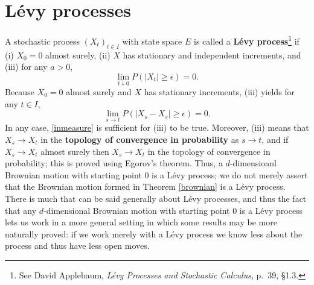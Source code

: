 \documentclass{article}
\theoremstyle{definition}
\begin{document}
\section{L\'evy processes}
A stochastic process $(X_t)_{t \in I}$ with state space $E$ is called a \textbf{L\'evy process}\footnote{See
David Applebaum, {\em L\'evy Processes and Stochastic Calculus}, p.~39, \S 1.3.}
 if
(i) $X_0=0$ almost surely, (ii) $X$ has stationary and independent increments, and (iii)
for any $a>0$,
\[
\lim_{t \downarrow 0} P(|X_{t}| \geq \epsilon) = 0.
\]
Because $X_0=0$ almost surely and $X$ has stationary increments, (iii) yields for
any $t \in I$,
\begin{equation}
\lim_{s \to t} P(|X_s-X_s| \geq \epsilon)=0.
\label{inmeasure}
\end{equation}
In any case, \eqref{inmeasure} is sufficient for (iii) to be true.
Moreover, (iii) means
that $X_s \to X_t$ in the \textbf{topology of convergence in probability} as $s \to t$, and 
if $X_s \to X_t$ almost surely then  $X_s \to X_t$ in the topology of convergence in probability; this is proved
using Egorov's theorem.
Thus, a $d$-dimensioanl Brownian motion with starting point $0$ is a L\'evy process; we do not merely assert that the Brownian motion
formed in Theorem \ref{brownian} is a L\'evy process.
There is much that can be said generally about L\'evy processes, and thus the fact that any $d$-dimensional Brownian motion with starting point $0$ is a L\'evy
process lets us work in a more general setting in which some results may be more naturally proved: if we work merely with a L\'evy process we know less about the process and thus have less open moves. 
\end{document}
